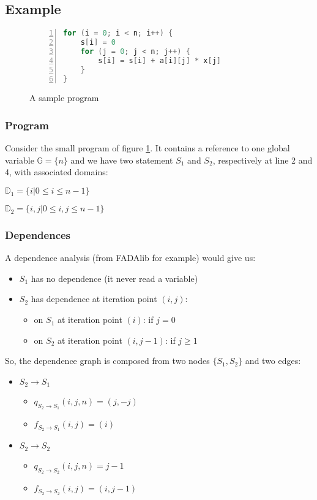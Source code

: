 		\subsection{Example}
		\label{polyhedric:maths:example}

\begin{figure}[!h]	
\begin{lstlisting}[language=C, numbers=left]
for (i = 0; i < n; i++) {
    s[i] = 0
    for (j = 0; j < n; j++) {
        s[i] = s[i] + a[i][j] * x[j]
    }
}
\end{lstlisting}
\caption{A sample program}
\label{polyhedric:sampleprogram}
\end{figure}

			\subsubsection{Program}

Consider the small program of figure \ref{polyhedric:sampleprogram}. It contains a reference to one global variable
$\mathbb{G} = \{ n \}$ and we have two statement $S_{1}$ and $S_{2}$, respectively at line 2 and 4, with associated domains:

$\mathbb{D}_{1} = \{ i | 0 \leq i \leq n - 1 \}$ 

$\mathbb{D}_{2} = \{ i, j | 0 \leq i, j \leq n - 1 \}$

			\subsubsection{Dependences}

A dependence analysis (from FADAlib for example) would give us:
\begin{itemize}
	\item $S_{1}$ has no dependence (it never read a variable)
	\item $S_{2}$ has dependence at iteration point $( i, j )$:
	\begin{itemize}
		\item on $S_{1}$ at iteration point $( i )$: if $j = 0$ 
		\item on $S_{2}$ at iteration point $( i, j - 1 )$: if $j \geq 1$ 
	\end{itemize}
\end{itemize}

So, the dependence graph is composed from two nodes $\{S_{1}, S_{2}\}$ and two edges:
\begin{itemize}
	\item $S_{2} \rightarrow S_{1}$
	\begin{itemize}
		\item $q_{S_{2} \rightarrow S_{1}}(i, j, n) = (j, -j)$
		\item $f_{S_{2} \rightarrow S_{1}}(i, j) = (i)$
	\end{itemize}
	\item $S_{2} \rightarrow S_{2}$
	\begin{itemize}
		\item $q_{S_{2} \rightarrow S_{2}}(i, j, n) = j - 1$
		\item $f_{S_{2} \rightarrow S_{2}}(i, j) = (i, j - 1)$
	\end{itemize}
\end{itemize}

